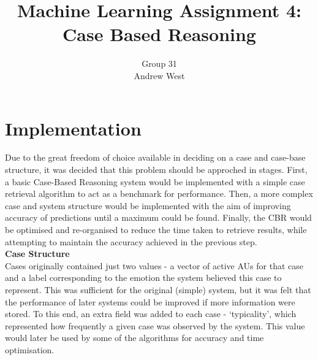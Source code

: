 \documentclass[a4paper]{article}
\title{Machine Learning Assignment 4: Case Based Reasoning}
\author{Group 31 \\ Andrew West}
\begin{document}
\maketitle

\section{Implementation}


Due to the great freedom of choice available in deciding on a case and case-base structure, it was decided that this problem
should be approched in stages. First, a basic Case-Based Reasoning system would be implemented with a simple case retrieval algorithm
to act as a benchmark for performance. Then, a more complex case and system structure would be implemented with the aim of improving
accuracy of predictions until a maximum could be found. Finally, the CBR would be optimised and re-organised to reduce
the time taken to retrieve results, while attempting to maintain the accuracy achieved in the previous step.\\

{\bf Case Structure}\\
Cases originally contained just two values - a vector of active AUs for that case and a label corresponding to the emotion the system
believed this case to represent. This was sufficient for the original (simple) system, but it was felt that the performance of later
systems could be improved if more information were stored. To this end, an extra field was added to each case - `typicality', which represented
how frequently a given case was observed by the system. This value would later be used by some of the algorithms for 
accuracy and time optimisation.\\
\end{document}
